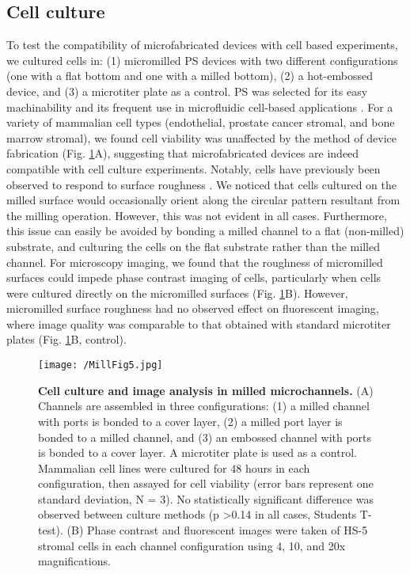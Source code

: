 {\subsection{Cell culture}
To test the compatibility of microfabricated devices with cell based experiments, we cultured cells in: (1) micromilled PS devices with two different configurations (one with a flat bottom and one with a milled bottom), (2) a hot-embossed device, and (3) a microtiter plate as a control. PS was selected for its easy machinability and its frequent use in microfluidic cell-based applications \cite{Berthier2012, Berthier2013}. For a variety of mammalian cell types (endothelial, prostate cancer stromal, and bone marrow stromal), we found cell viability was unaffected by the method of device fabrication (Fig. \ref{figure:MillFig5}A), suggesting that microfabricated devices are indeed compatible with cell culture experiments. Notably, cells have previously been observed to respond to surface roughness \cite{Anselme2010, Kieswetter1996, Hatano1999, Deligianni2001, Xu2004, Mustafa2005, Anselme2010, Dowling2011, Gittens2011}. We noticed that cells cultured on the milled surface would occasionally orient along the circular pattern resultant from the milling operation. However, this was not evident in all cases. Furthermore, this issue can easily be avoided by bonding a milled channel to a flat (non-milled) substrate, and culturing the cells on the flat substrate rather than the milled channel. For microscopy imaging, we found that the roughness of micromilled surfaces could impede phase contrast imaging of cells, particularly when cells were cultured directly on the micromilled surfaces (Fig. \ref{figure:MillFig5}B). However, micromilled surface roughness had no observed effect on fluorescent imaging, where image quality was comparable to that obtained with standard microtiter plates (Fig. \ref{figure:MillFig5}B, control).

\begin{figure}[h!] %
\centering
\texttt{[image: /MillFig5.jpg]}
\caption[\textbf{Cell culture and image analysis in milled microchannels.}]{\textbf{Cell culture and image analysis in milled microchannels.} (A) Channels are assembled in three configurations: (1) a milled channel with ports is bonded to a cover layer, (2) a milled port layer is bonded to a milled channel, and (3) an embossed channel with ports is bonded to a cover layer. A microtiter plate is used as a control. Mammalian cell lines were cultured for 48 hours in each configuration, then assayed for cell viability (error bars represent one standard deviation, N = 3). No statistically significant difference was observed between culture methods (p \textgreater 0.14 in all cases, Students T-test). (B) Phase contrast and fluorescent images were taken of HS-5 stromal cells in each channel configuration using 4, 10, and 20x magnifications.}
\label{figure:MillFig5}
\end{figure}


}
